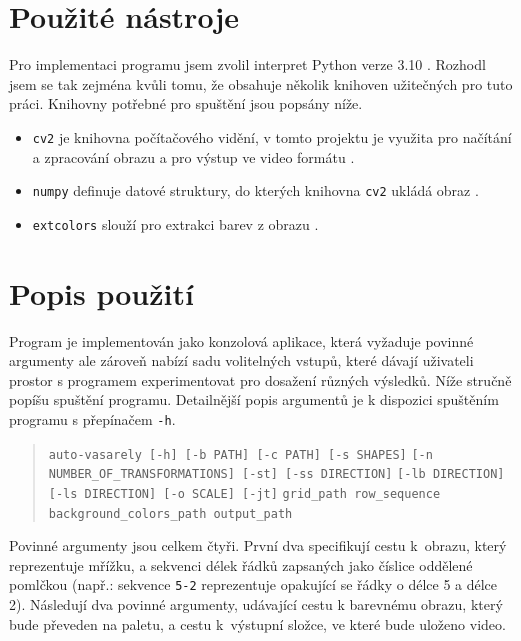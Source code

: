 \section{Použité nástroje}
\label{impl:utils}
Pro implementaci programu jsem zvolil interpret Python verze 3.10 \cite{python}. Rozhodl jsem se tak zejména kvůli tomu, že obsahuje několik knihoven užitečných pro tuto práci. Knihovny potřebné pro spuštění jsou popsány níže.

\begin{itemize}
    \item \verb|cv2| je knihovna počítačového vidění, v tomto projektu je využita pro načítání a zpracování obrazu a pro výstup ve video formátu \cite{cv2}.
    \item \verb|numpy| definuje datové struktury, do kterých knihovna \verb|cv2| ukládá obraz \cite{numpy}.
    \item \verb|extcolors| slouží pro extrakci barev z obrazu \cite{extcolors}.
\end{itemize}

\section{Popis použití}

Program je implementován jako konzolová aplikace, která vyžaduje povinné argumenty ale zároveň nabízí sadu volitelných vstupů, které dávají uživateli prostor s programem experimentovat pro dosažení různých výsledků. Níže stručně popíšu spuštění programu. Detailnější popis argumentů je k dispozici spuštěním programu s přepínačem \verb|-h|.

\begin{quote}
    \verb|auto-vasarely [-h] [-b PATH] [-c PATH] [-s SHAPES]| \linebreak
    \verb|[-n NUMBER_OF_TRANSFORMATIONS] [-st] [-ss DIRECTION]| \linebreak
    \verb|[-lb DIRECTION] [-ls DIRECTION] [-o SCALE] [-jt]| \linebreak
    \verb|grid_path row_sequence background_colors_path output_path| \linebreak
\end{quote}

Povinné argumenty jsou celkem čtyři. První dva specifikují cestu k~obrazu, který reprezentuje mřížku, a sekvenci délek řádků zapsaných jako číslice oddělené pomlčkou (např.: sekvence \verb|5-2| reprezentuje opakující se řádky o délce 5 a délce 2). Následují dva povinné argumenty, udávající cestu k barevnému obrazu, který bude převeden na paletu, a cestu k~výstupní složce, ve které bude uloženo video.

